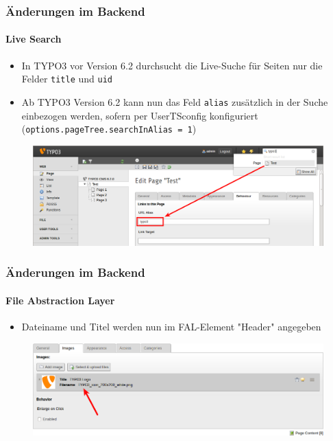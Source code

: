 
\begin{frame}[fragile]
	\frametitle{Änderungen im Backend}
	\framesubtitle{Live Search}

	\begin{itemize}
		\item In TYPO3 vor Version 6.2 durchsucht die Live-Suche für Seiten nur die Felder \texttt{title} und \texttt{uid}
		\item Ab TYPO3 Version 6.2 kann nun das Feld \texttt{alias} zusätzlich in der Suche einbezogen werden, sofern per UserTSconfig konfiguriert\newline
			\smaller(\texttt{options.pageTree.searchInAlias = 1})\normalsize
	\end{itemize}

	\begin{figure}
		\includegraphics[width=0.8\linewidth]{Images/BackendChanges/LiveSearchInAlias.png}
	\end{figure}

\end{frame}


\begin{frame}[fragile]
	\frametitle{Änderungen im Backend}
	\framesubtitle{File Abstraction Layer}

	\begin{itemize}
		\item Dateiname und Titel werden nun im FAL-Element "Header" angegeben
	\end{itemize}

	\begin{figure}
		\includegraphics[width=0.95\linewidth]{Images/BackendChanges/FalTitleAndFilename.png}
	\end{figure}

\end{frame}

